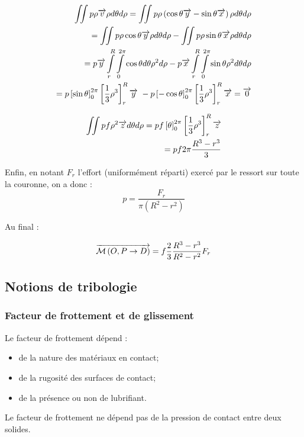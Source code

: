 \documentclass[10pt]{article}
\begin{document}
\begin{exemple}
\begin{eqnarray*}
\iint p\rho\overrightarrow{v} \rho d\theta d\rho = \iint p\rho\left(\cos\theta\overrightarrow{y}-\sin\theta\overrightarrow{x} \right) \rho d\theta d\rho \\
=\iint p\rho\cos\theta\overrightarrow{y}  \rho d\theta d\rho-\iint p\rho \sin\theta\overrightarrow{x}  \rho d\theta d\rho \\
=p \overrightarrow{y}  \int\limits_{r}^{R} \int\limits_{0}^{2\pi}\cos\theta d\theta \rho^2 d\rho- p\overrightarrow{x}\int\limits_{r}^{R} \int\limits_{0}^{2\pi} \sin\theta  \rho^2 d\theta d\rho \\
=p \left[ \sin\theta\right]_{0}^{2\pi}\left[ \dfrac{1}{3}\rho^3\right]_{r}^{R}\overrightarrow{y}\
 -
p \left[ -\cos\theta\right]_{0}^{2\pi}\left[ \dfrac{1}{3}\rho^3\right]_{r}^{R}\overrightarrow{x} = \overrightarrow{0}
\end{eqnarray*}

\begin{eqnarray*}
\iint pf\rho^2 \overrightarrow{z} d\theta d\rho =
pf \left[ \theta\right]_{0}^{2\pi}\left[ \dfrac{1}{3}\rho^3\right]_{r}^{R} \overrightarrow{z}\\
= pf2\pi \dfrac{R^3-r^3}{3} 
\end{eqnarray*} 

Enfin, en notant $F_r$ l'effort (uniformément réparti) exercé par le ressort sur toute la couronne, on a donc :
$$
p=\dfrac{F_r}{\pi \left(R^2-r^2 \right)}
$$

Au final : 

$$ \overrightarrow{\mathcal{M}\left( {O}, {P} \rightarrow {D}\right)}  
= f\dfrac{2}{3} \dfrac{R^3-r^3}{R^2-r^2} F_r
$$
\end{exemple}
\subsection{Notions de tribologie}

\subsubsection{Facteur de frottement et de glissement}
Le facteur de frottement dépend : 
\begin{itemize}
\item de la nature des matériaux en contact; 
\item de la rugosité des surfaces de contact; 
\item de la présence ou non de lubrifiant.
\end{itemize}

Le facteur de frottement ne dépend pas de la pression de contact entre deux solides.
\end{document}
